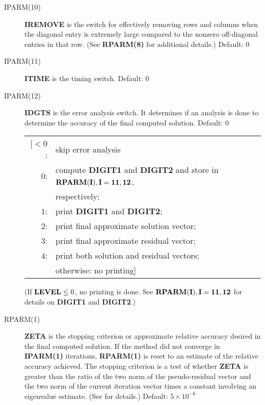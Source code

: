\begin{description}
 \item[IPARM(10)] {\bf IREMOVE} is the switch for effectively removing
                  rows and columns when the diagonal entry is extremely 
                  large compared to the nonzero off-diagonal entries in 
                  that row.  (See {\bf RPARM(8)} for additional details.)
                  Default: $0$
 
 
 \item[IPARM(11)] {\bf ITIME} is the timing switch.  Default: $0$
 
 
 \item[IPARM(12)] {\bf IDGTS} is the error analysis switch.  It determines
                  if an analysis is done to determine the accuracy 
                  of the final computed solution.  Default: $0$
 
                  \begin{tabular}{rl} 
                  [$<0$: & skip error analysis \\
                   $0$:  & compute {\bf DIGIT1} and {\bf DIGIT2} and 
                           store in ${\bf RPARM(I), I=11,12}$, \\ 
                         & respectively; \\
                   $1$:  & print {\bf DIGIT1} and {\bf DIGIT2}; \\
                   $2$:  & print final approximate solution vector; \\
                   $3$:  & print final approximate residual vector; \\
                   $4$:  & print both solution and residual vectors; \\
                         & otherwise:  no printing]
                  \end{tabular}

                  \noindent
                  (If ${\bf LEVEL} \leq 0$, no printing is done.  See 
                  ${\bf RPARM(I), I=11,12}$ for details on {\bf DIGIT1} 
                  and {\bf DIGIT2}.)
  
 \item[RPARM(1)] {\bf ZETA} is the stopping criterion or approximate 
                 relative accuracy desired in the final computed solution.
                 If the method did not converge in {\bf IPARM(1)} 
                 iterations, {\bf RPARM(1)} is reset to an estimate of 
                 the relative accuracy achieved.  The stopping criterion 
                 is a test of whether {\bf ZETA} is greater than the 
                 ratio of the two norm of the pseudo-residual vector and 
                 the two norm of the current iteration vector times a 
                 constant involving an eigenvalue estimate.  (See \cite{1,2} 
                 for details.) Default: $5 \times 10^{-6}$


\end{description}
